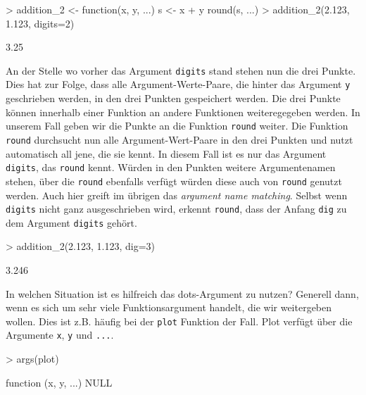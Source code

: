\documentclass[12pt, a4paper,twoside,openany,x11names,svgnames]{memoir}
\begin{document}
\begin{Schunk}
\begin{Sinput}
> addition_2 <- function(x, y, ...) {
   s <- x + y
   round(s, ...)
 }
> addition_2(2.123, 1.123, digits=2)
\end{Sinput}
\begin{Soutput}
[1] 3.25
\end{Soutput}
\end{Schunk}

An der Stelle wo vorher das Argument \texttt{digits} stand stehen nun die drei Punkte. Dies hat zur Folge, dass alle Argument-Werte-Paare, die hinter das Argument \texttt{y} geschrieben werden, in den drei Punkten gespeichert werden. Die drei Punkte können innerhalb einer Funktion an andere Funktionen weiteregegeben werden. In unserem Fall geben wir die Punkte an die Funktion \texttt{round} weiter. Die Funktion \texttt{round} durchsucht nun alle Argument-Wert-Paare in den drei Punkten und nutzt automatisch all jene, die sie kennt. In diesem Fall ist es nur das Argument \texttt{digits}, das \texttt{round} kennt. Würden in den Punkten weitere Argumentenamen stehen, über die \texttt{round} ebenfalls verfügt würden diese auch von \texttt{round} genutzt werden. Auch hier greift im übrigen das \emph{argument name matching}. Selbst wenn \texttt{digits} nicht ganz ausgeschrieben wird, erkennt \texttt{round}, dass der Anfang \texttt{dig} zu dem Argument \texttt{digits} gehört.

\begin{Schunk}
\begin{Sinput}
> addition_2(2.123, 1.123, dig=3)
\end{Sinput}
\begin{Soutput}
[1] 3.246
\end{Soutput}
\end{Schunk}

In welchen Situation ist es hilfreich das dots-Argument zu nutzen? Generell dann, wenn es sich um sehr viele Funktionsargument handelt, die wir weitergeben wollen. Dies ist z.B. häufig bei der \texttt{plot} Funktion der Fall. Plot verfügt über die Argumente \texttt{x}, \texttt{y} und \texttt{...}.

\begin{Schunk}
\begin{Sinput}
> args(plot)
\end{Sinput}
\begin{Soutput}
function (x, y, ...) 
NULL
\end{Soutput}
\end{Schunk}
\end{document}
